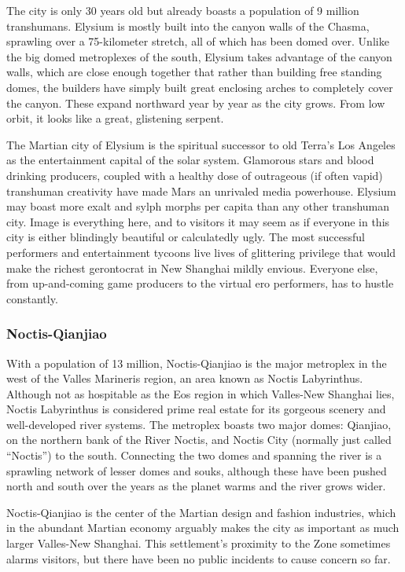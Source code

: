 The city is only 30 years old but already boasts 
a population of 9 million transhumans. Elysium is 
mostly built into the canyon walls of the Chasma, 
sprawling over a 75-kilometer stretch, all of which 
has been domed over. Unlike the big domed metroplexes of the south, Elysium takes advantage of the 
canyon walls, which are close enough together that 
rather than building free standing domes, the builders 
have simply built great enclosing arches to completely 
cover the canyon. These expand northward year by 
year as the city grows. From low orbit, it looks like a 
great, glistening serpent.

The Martian city of Elysium is the spiritual successor to old Terra's Los Angeles as the entertainment 
capital of the solar system. Glamorous stars and 
blood drinking producers, coupled with a healthy 
dose of outrageous (if often vapid) transhuman 
creativity have made Mars an unrivaled media powerhouse. Elysium may boast more exalt and sylph 
morphs per capita than any other transhuman city. 
Image is everything here, and to visitors it may seem 
as if everyone in this city is either blindingly beautiful 
or calculatedly ugly. The most successful performers and entertainment tycoons live lives of glittering 
privilege that would make the richest gerontocrat in 
New Shanghai mildly envious. Everyone else, from 
up-and-coming game producers to the virtual ero 
performers, has to hustle constantly.

\subsubsection{Noctis-Qianjiao}

With a population of 13 million, Noctis-Qianjiao is 
the major metroplex in the west of the Valles Marineris region, an area known as Noctis Labyrinthus. 
Although not as hospitable as the Eos region in which 
Valles-New Shanghai lies, Noctis Labyrinthus is considered prime real estate for its gorgeous scenery and 
well-developed river systems. The metroplex boasts 
two major domes: Qianjiao, on the northern bank 
of the River Noctis, and Noctis City (normally just 
called ``Noctis'') to the south. Connecting the two 
domes and spanning the river is a sprawling network 
of lesser domes and souks, although these have been 
pushed north and south over the years as the planet 
warms and the river grows wider.

Noctis-Qianjiao is the center of the Martian design 
and fashion industries, which in the abundant Martian economy arguably makes the city as important 
as much larger Valles-New Shanghai. This settlement's 
proximity to the Zone sometimes alarms visitors, but 
there have been no public incidents to cause concern 
so far.

